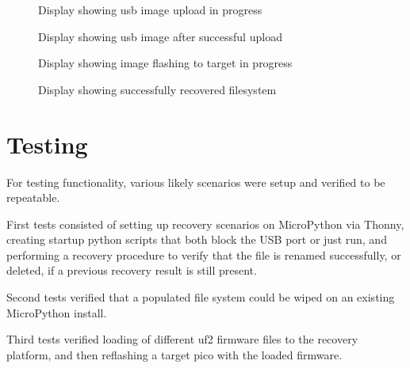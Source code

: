 \begin{figure}[ht]
	\centering
	\caption{Display showing usb image upload in progress}
	\label{fig:disp_usbload}
\end{figure}

\begin{figure}[ht]
	\centering
	\caption{Display showing usb image after successful upload}
	\label{fig:disp_usbloaded}
\end{figure}

\begin{figure}[ht]
	\centering
	\caption{Display showing image flashing to target in progress}
	\label{fig:disp_flashwrite}
\end{figure}

\begin{figure}[ht]
	\centering
	\caption{Display showing successfully recovered filesystem}
	\label{fig:disp_fs_recovered}
\end{figure}

\clearpage
\section{Testing}

For testing functionality, various likely scenarios were setup and verified to be repeatable.

First tests consisted of setting up recovery scenarios on MicroPython via Thonny\cite{ThonnyPythonIDE}, creating startup python scripts that both block the USB port or just run, and performing a recovery procedure to verify that the file is renamed successfully, or deleted, if a previous recovery result is still present.

Second tests verified that a populated file system could be wiped on an existing MicroPython install.

Third tests verified loading of different uf2 firmware files to the recovery platform, and then reflashing a target pico with the loaded firmware.




